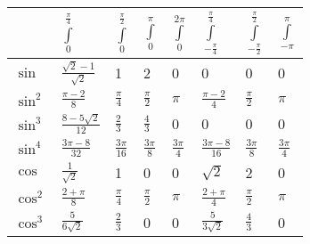 \renewcommand{\arraystretch}{1.4}

\begin{tabular}{p{1.3cm}|p{1cm}|p{0.55cm}|p{0.55cm}|p{0.55cm}|p{0.8cm}|p{0.55cm}|p{0.5cm}} %
                        & $\int\limits_0^{\frac{\pi}{4}} $ & $\int\limits_0^{\frac{\pi}{2}}$ & $\int\limits_0^{\pi}$ & $\int\limits_0^{2\pi}$ & $\int\limits_{-\frac{\pi}{4}}^{\frac{\pi}{4}} $ & $\int\limits_{-\frac{\pi}{2}}^{\frac{\pi}{2}} $ & $\int\limits_{-\pi}^{\pi}$ \\ \hline %
    $\sin$              & $\frac{\sqrt{2}-1}{\sqrt{2}}$    & 1                               & 2                     & 0                      & 0                                               & 0                                               & 0                          \\ \hline %
    $\sin^2$            & $\frac{\pi-2}{8}$                & $\frac{\pi}{4}$                 & $\frac{\pi}{2}$       & $\pi$                  & $\frac{\pi-2}{4}$                               & $\frac{\pi}{2}$                                 & $\pi$                      \\ \hline %
    $\sin^3$            & $\frac{8-5\sqrt{2}}{12}$         & $\frac{2}{3}$                   & $\frac{4}{3}$         & 0                      & 0                                               & 0                                               & 0                          \\ \hline %
    $\sin^4$            & $\frac{3\pi-8}{32}$              & $\frac{3\pi}{16}$               & $\frac{3\pi}{8}$      & $\frac{3\pi}{4}$       & $\frac{3\pi-8}{16}$                             & $\frac{3\pi}{8}$                                & $\frac{3\pi}{4}$           \\ \hline %
    $\cos$              & $ \frac{1}{\sqrt{2}}$            & 1                               & 0                     & 0                      & $\sqrt{2}$                                      & 2                                               & 0                          \\ \hline %
    $\cos^2$            & $\frac{2+\pi}{8}$                & $\frac{\pi}{4}$                 & $\frac{\pi}{2}$       & $\pi$                  & $\frac{2+\pi}{4}$                               & $\frac{\pi}{2}$                                 & $\pi$                      \\ \hline %
    $\cos^3$            & $\frac{5}{6\sqrt{2}}$            & $\frac{2}{3}$                   & 0                     & 0                      & $\frac{5}{3\sqrt{2}}$                           & $\frac{4}{3}$                                   & 0                          \\ \hline %

\end{tabular}
